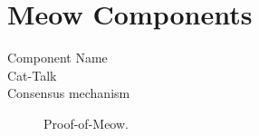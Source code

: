 \section{Meow Components}\label{functional-components}

 \lipsumeow
 
\begin{description}
    \item[Component Name]
    
    \item[Cat-Talk] \lipsumeow
    
    \item[Consensus mechanism] Proof-of-Meow. \lipsumeow

\end{description}
